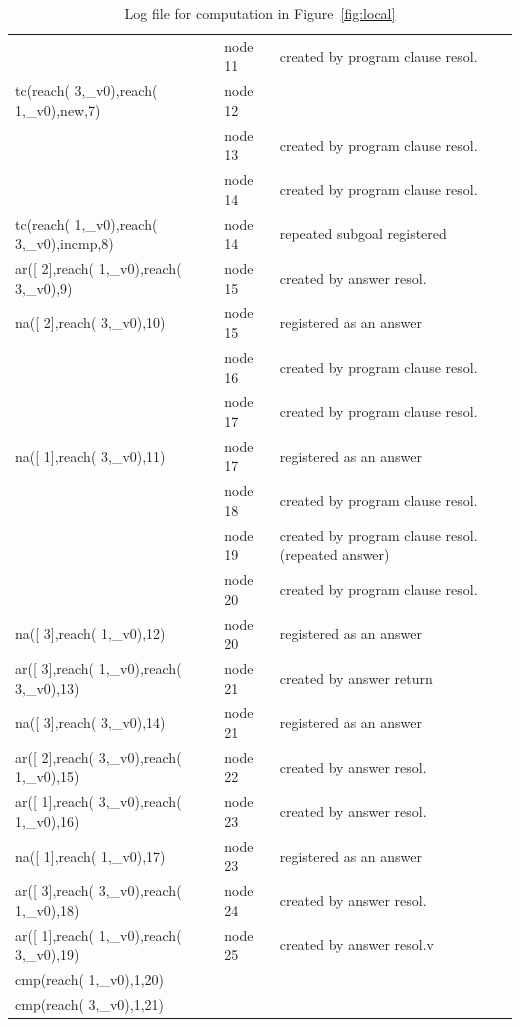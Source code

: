 \begin{example}
\begin{table}[htbp]
\begin{tabular}{lll}
                                             & node 11 & created by program clause resol. \\
tc(reach( 3,\_v0),reach( 1,\_v0),new,7)      & node 12 & \\
                                             & node 13 & created by program clause resol. \\
                                             & node 14 & created by program clause resol. \\
tc(reach( 1,\_v0),reach( 3,\_v0),incmp,8)    & node 14 & repeated subgoal registered \\
ar([ 2],reach( 1,\_v0),reach( 3,\_v0),9)     & node 15 & created by answer resol. \\
na([ 2],reach( 3,\_v0),10)                   & node 15 & registered as an answer \\
                                             & node 16 & created by program clause resol. \\
                                             & node 17 & created by program clause resol. \\
na([ 1],reach( 3,\_v0),11)                   & node 17 & registered as an answer \\
                                             & node 18 & created by program clause resol. \\
                                             & node 19 & created by program clause resol. (repeated answer)\\
                                             & node 20 & created by program clause resol.\\
na([ 3],reach( 1,\_v0),12)                   & node 20 & registered as an answer\\
ar([ 3],reach( 1,\_v0),reach( 3,\_v0),13)    & node 21 & created by answer return\\
na([ 3],reach( 3,\_v0),14)                   & node 21 & registered as an answer\\
ar([ 2],reach( 3,\_v0),reach( 1,\_v0),15)    & node 22 & created by answer resol.\\
ar([ 1],reach( 3,\_v0),reach( 1,\_v0),16)    & node 23 & created by answer resol.\\
na([ 1],reach( 1,\_v0),17)                   & node 23 & registered as an answer \\
ar([ 3],reach( 3,\_v0),reach( 1,\_v0),18)    & node 24 & created by answer resol. \\
ar([ 1],reach( 1,\_v0),reach( 3,\_v0),19)    & node 25 & created by answer resol.v \\
cmp(reach( 1,\_v0),1,20)                     &  & \\
cmp(reach( 3,\_v0),1,21)   & & \\ \hline
\end{tabular}
\caption{Log file for computation in Figure~\ref{fig:local}}\label{tab:fview}
\end{table}
\end{example}

